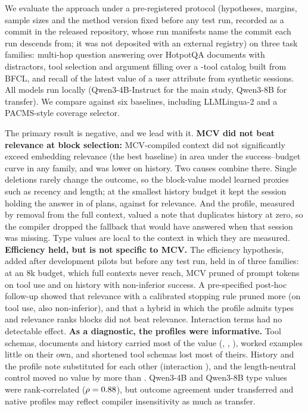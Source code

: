 We evaluate the approach under a pre-registered protocol (hypotheses, margins, sample sizes and the method version fixed
before any test run, recorded as a commit in the released repository, whose run manifests name the commit each run descends from; it was not
deposited with an external registry) on three task families: multi-hop question answering over HotpotQA documents with distractors,
tool selection and argument filling over a \RNumTools-tool catalog built from BFCL, and recall of the latest value of a
user attribute from \RNumSessions synthetic sessions. All models run locally (Qwen3-4B-Instruct for the main study,
Qwen3-8B for transfer). We compare against six baselines, including LLMLingua-2 and a PACMS-style coverage selector.

The primary result is negative, and we lead with it. \textbf{MCV did not beat relevance at block selection:}
MCV-compiled context did not significantly exceed embedding relevance (the best baseline) in area under the
success--budget curve in any family, and was \RHOneHistoryAbs{} lower on history. Two causes combine there. Single
deletions rarely change the outcome, so the block-value model learned proxies such as recency and length; at the smallest
history budget it kept the session holding the answer in \RRecallOurs of plans, against \RRecallRel for relevance. And the
profile, measured by removal from the full context, valued a note that duplicates history at zero, so the compiler dropped
the fallback that would have answered when that session was missing. Type values are local to the context in which they
are measured.
\textbf{Efficiency held, but is not specific to MCV.} The efficiency hypothesis, added after development pilots but before
any test run, held in \RHOnebPass of three families: at an 8k budget, which full contexts never reach, MCV pruned
\RTokCutTool of prompt tokens on tool use and \RTokCutHistory on history with non-inferior success. A pre-specified
post-hoc follow-up showed that relevance with a calibrated stopping rule pruned more (\RTokCutStopTool on tool use, also
non-inferior), and that a hybrid in which the profile admits types and relevance ranks blocks did not beat relevance.
Interaction terms had no detectable effect. \textbf{As a diagnostic, the profiles were informative.} Tool schemas,
documents and history carried most of the value (\RMcvToolToolSchema, \RMcvFactsFact, \RMcvHistoryHistoryTurn),
worked examples little on their own, and shortened tool schemas lost most of theirs. History and the profile note
substituted for each other (interaction \RIntHistoryHistoryTurnNote), and the length-neutral control moved no value by
more than \RPadDiffMax. Qwen3-4B and Qwen3-8B type values were rank-correlated ($\rho=0.88$), but outcome agreement under
transferred and native profiles may reflect compiler insensitivity as much as transfer.

